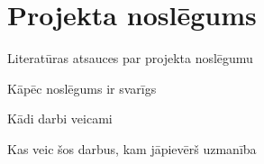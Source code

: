 \section{Projekta noslēgums}
Literatūras atsauces par projekta noslēgumu
\par
Kāpēc noslēgums ir svarīgs
\par
Kādi darbi veicami
\par
Kas veic šos darbus, kam jāpievērš uzmanība


